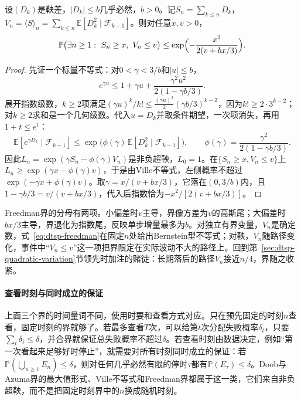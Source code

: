 \begin{theorem}[Freedman不等式]
  \label{thm:dtsp-freedman}
  设$(D_k)$是鞅差，$|D_k|\leq b$几乎必然，$b>0$。记$S_n=\sum_{k\leq n}D_k$，$V_n=\langle S\rangle_n=\sum_{k\leq n}\mathbb E[D_k^2\mid\mathcal F_{k-1}]$。则对任意$x,v>0$，
  \begin{equation}
    \mathbb P\bigl(\exists n\geq1:\ S_n\geq x,\ V_n\leq v\bigr)\leq\exp\Bigl(-\frac{x^2}{2(v+bx/3)}\Bigr).
    \label{eq:dtsp-freedman}
  \end{equation}
\end{theorem}

\begin{proof}
先证一个标量不等式：对$0<\gamma<3/b$和$|u|\leq b$，
\[
  e^{\gamma u}\leq1+\gamma u+\frac{\gamma^2u^2}{2(1-\gamma b/3)}.
\]
展开指数级数，$k\geq2$项满足$(\gamma u)^k/k!\leq\frac{(\gamma u)^2}{2}(\gamma b/3)^{k-2}$，因为$k!\geq2\cdot3^{k-2}$；对$k\geq2$求和是一个几何级数。代入$u=D_k$并取条件期望，一次项消失，再用$1+t\leq e^t$：
\[
  \mathbb E[e^{\gamma D_k}\mid\mathcal F_{k-1}]\leq\exp\bigl(\phi(\gamma)\,\mathbb E[D_k^2\mid\mathcal F_{k-1}]\bigr),\qquad
  \phi(\gamma)=\frac{\gamma^2}{2(1-\gamma b/3)}.
\]
因此$L_n=\exp(\gamma S_n-\phi(\gamma)V_n)$是非负超鞅，$L_0=1$。在$\{S_n\geq x,V_n\leq v\}$上$L_n\geq\exp(\gamma x-\phi(\gamma)v)$，于是由Ville不等式，左侧概率不超过$\exp(-\gamma x+\phi(\gamma)v)$。取$\gamma=x/(v+bx/3)$，它落在$(0,3/b)$内，且$1-\gamma b/3=v/(v+bx/3)$，代入后指数恰为$-x^2/[2(v+bx/3)]$。
\end{proof}

Freedman界的分母有两项。小偏差时$v$主导，界像方差为$v$的高斯尾；大偏差时$bx/3$主导，界退化为指数尾，反映单步增量最多为$b$。对独立有界变量，$V_n$是确定数，式~\eqref{eq:dtsp-freedman}在固定$n$处给出Bernstein型不等式；对鞅，$V_n$随路径变化，事件中“$V_n\leq v$”这一项把界限定在实际波动不大的路径上。回到第~\ref{sec:dtsp-quadratic-variation}节领先时加注的赌徒：长期落后的路径$V_n$接近$n/4$，界随之收紧。

\paragraph{查看时刻与同时成立的保证}
上面三个界的时间量词不同，使用时要和查看方式对应。只在预先固定的时刻$n$查看，固定时刻的界就够了。若最多查看$T$次，可以给第$t$次分配失败概率$\delta_t$，只要$\sum_t\delta_t\leq\delta$，并合界就保证总失败概率不超过$\delta$。若查看时刻由数据决定，例如“第一次看起来足够好时停止”，就需要对所有时刻同时成立的保证：若$\mathbb P(\bigcup_{n\geq1}E_n)\leq\delta$，则对任何几乎必然有限的停时$\tau$都有$\mathbb P(E_\tau)\leq\delta$。Doob与Azuma界的最大值形式、Ville不等式和Freedman界都属于这一类，它们来自非负超鞅，而不是把固定时刻界中的$n$换成随机时刻。

